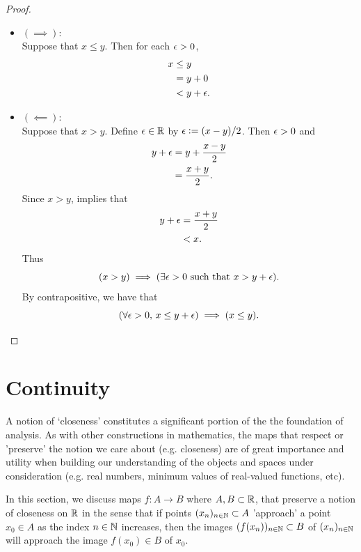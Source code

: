 \documentclass{book}
\begin{document}
	\begin{proof}\
		\begin{itemize}
			\item $(\implies)$: \\
			Suppose that $x \leq y$. Then for each $\epsilon >0$,
			\begin{align*}
				x
				& \leq y \\
				& = y + 0 \\
				& < y + \epsilon.
			\end{align*}
			\item $(\impliedby)$: \\
			Suppose that $x > y$. Define $\epsilon \in \mathbb{R}$ by $\epsilon \vcentcolon= (x - y)/2$. Then $\epsilon > 0$ and
			\begin{align*}
				y + \epsilon 
				& = y + \frac{x - y}{2} \\
				& = \frac{x + y}{2}.
			\end{align*} 
			Since $x > y$,  implies that
			\begin{align*}
				y + \epsilon 
				& = \frac{x + y}{2} \\
				& < x.
			\end{align*}
			Thus 
			$$(\text{$x > y$}) \implies (\text{$\exists \epsilon > 0$ such that $x > y + \epsilon$}).$$
			By contrapositive, we have that
			$$(\text{$\forall \epsilon > 0$, $x \leq y + \epsilon$}) \implies (\text{$x \leq y$}).$$
		\end{itemize}
	\end{proof}
	
	
	
	\section{Continuity}
	
	A notion of `closeness' constitutes a significant portion of the the foundation of analysis. As with other constructions in mathematics, the maps that respect or 'preserve' the notion we care about (e.g. closeness) are of great importance and utility when building our understanding of the objects and spaces under consideration (e.g. real numbers, minimum values of real-valued functions, etc). 
	
	In this section, we discuss maps $f: A \rightarrow B$ where $A,B \subset \mathbb{R}$, that preserve a notion of closeness on $\mathbb{R}$ in the sense that if points $(x_n)_{n \in \mathbb{N}} \subset A$ 'approach' a point $x_0 \in A$ as the index $n \in \mathbb{N}$ increases, then the images $(f(x_n))_{n \in \mathbb{N}} \subset B$ of $(x_n)_{n \in \mathbb{N}}$ will approach the image $f(x_0) \in B$ of $x_0$.  
	
\end{document}
